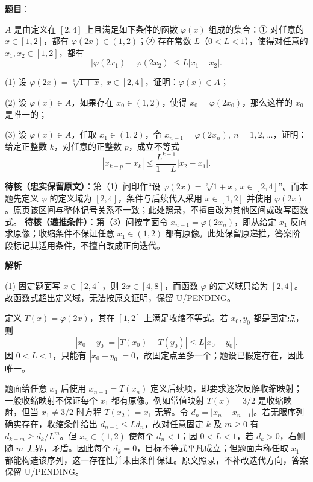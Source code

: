 \begin{answer}

\textbf{题目}：

\(A\) 是由定义在 \([2,4]\) 上且满足如下条件的函数 \(\varphi(x)\) 组成的集合：① 对任意的 \(x\in[1,2]\)，都有 \(\varphi(2x)\in(1,2)\)；② 存在常数 \(L\)（\(0<L<1\)），使得对任意的 \(x_1,x_2\in[1,2]\)，都有
\nopagebreak[4]
\[
|\varphi(2x_1)-\varphi(2x_2)|\leq L|x_1-x_2|.
\]

(1) 设 \(\varphi(2x)=\sqrt[3]{1+x},\ x\in[2,4]\)，证明：\(\varphi(x)\in A\)；

(2) 设 \(\varphi(x)\in A\)，如果存在 \(x_0\in(1,2)\)，使得 \(x_0=\varphi(2x_0)\)，那么这样的 \(x_0\) 是唯一的；

(3) 设 \(\varphi(x)\in A\)，任取 \(x_1\in(1,2)\)，令 \(x_{n-1}=\varphi(2x_n),\ n=1,2,\ldots\)，证明：给定正整数 \(k\)，对任意的正整数 \(p\)，成立不等式
\nopagebreak[4]
\[
|x_{k+p}-x_k|\leq\frac{L^{k-1}}{1-L}|x_2-x_1|.
\]

\begin{gktip}
\textbf{待核（忠实保留原文）}：第（1）问印作“设 \(\varphi(2x)=\sqrt[3]{1+x},\ x\in[2,4]\)”。而本题先定义 \(\varphi\) 的定义域为 \([2,4]\)，条件与后续代入采用 \(x\in[1,2]\) 并使用 \(\varphi(2x)\)。原页该区间与整体记号关系不一致；此处照录，不擅自改为其他区间或改写函数式。
\textbf{待核（递推条件）}：第（3）问按字面令 \(x_{n-1}=\varphi(2x_n)\)，即从给定 \(x_1\) 反向求原像；收缩条件不保证任意 \(x_1\in(1,2)\) 都有原像。此处保留原递推，答案阶段标记其适用条件，不擅自改成正向迭代。
\end{gktip}

\textbf{解析}


(1) 固定题面写 $x\in[2,4]$，则 $2x\in[4,8]$，而函数 $\varphi$ 的定义域只给为 $[2,4]$。故函数式超出定义域，无法按原文证明，保留 U/PENDING。


定义 $T(x)=\varphi(2x)$，其在 $[1,2]$ 上满足收缩不等式。若 $x_0,y_0$ 都是固定点，则
\nopagebreak[4]
\[
|x_0-y_0|=|T(x_0)-T(y_0)|\le L|x_0-y_0|.
\]
因 $0<L<1$，只能有 $|x_0-y_0|=0$，故固定点至多一个；题设已假定存在，因此唯一。


题面给任意 $x_1$ 后使用 $x_{n-1}=T(x_n)$ 定义后续项，即要求逐次反解收缩映射；一般收缩映射不保证每个 $x_1$ 都有原像。例如常值映射 $T(x)=3/2$ 是收缩映射，但当 $x_1\ne3/2$ 时方程 $T(x_2)=x_1$ 无解。令 $d_n=|x_n-x_{n-1}|$。若无限序列确实存在，收缩条件给出 $d_{n-1}\le Ld_n$，故对任意固定 $k$ 及 $m\ge0$ 有 $d_{k+m}\ge d_k/L^m$。但 $x_n\in(1,2)$ 使每个 $d_n<1$；因 $0<L<1$，若 $d_k>0$，右侧随 $m$ 无界，矛盾。因此每个 $d_k=0$，目标不等式平凡成立；但题面声称任取 $x_1$ 都能构造该序列，这一存在性并未由条件保证。原文照录，不补改迭代方向，答案保留 U/PENDING。




\end{answer}